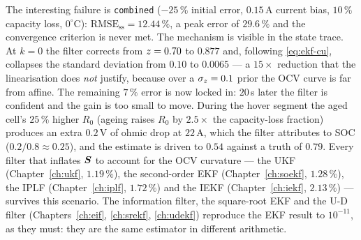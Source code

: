 The interesting failure is \texttt{combined} ($-25\,\%$ initial error, $0.15$\,A current bias,
$10\,\%$ capacity loss, $0^\circ$C): $\text{RMSE}_{\text{ss}} = 12.44\,\%$, a peak error of
$29.6\,\%$ and the convergence criterion is never met. The mechanism is visible in the state
trace. At $k=0$ the filter corrects from $z = 0.70$ to $0.877$ and, following
\eqref{eq:ekf-cu}, collapses the standard deviation from $0.10$ to $0.0065$ --- a $15\times$
reduction that the linearisation does \emph{not} justify, because over a $\sigma_z = 0.1$
prior the OCV curve is far from affine. The remaining $7\,\%$ error is now locked in: $20$\,s
later the filter is confident and the gain is too small to move. During the hover segment the
aged cell's $25\,\%$ higher $R_0$ (ageing raises $R_0$ by $2.5\times$ the capacity-loss
fraction) produces an extra $0.2$\,V of ohmic drop at $22$\,A, which the filter attributes to
SOC ($0.2/0.8\approx0.25$), and the estimate is driven to $0.54$ against a truth of $0.79$.
Every filter that inflates $\bm{S}$ to account for the OCV curvature --- the UKF
(Chapter~\ref{ch:ukf}, $1.19\,\%$), the second-order EKF (Chapter~\ref{ch:soekf}, $1.28\,\%$),
the IPLF (Chapter~\ref{ch:iplf}, $1.72\,\%$) and the IEKF (Chapter~\ref{ch:iekf}, $2.13\,\%$)
--- survives this scenario. The information filter, the square-root EKF and the U-D filter
(Chapters~\ref{ch:eif}, \ref{ch:srekf}, \ref{ch:udekf}) reproduce the EKF result to $10^{-11}$,
as they must: they are the same estimator in different arithmetic.

